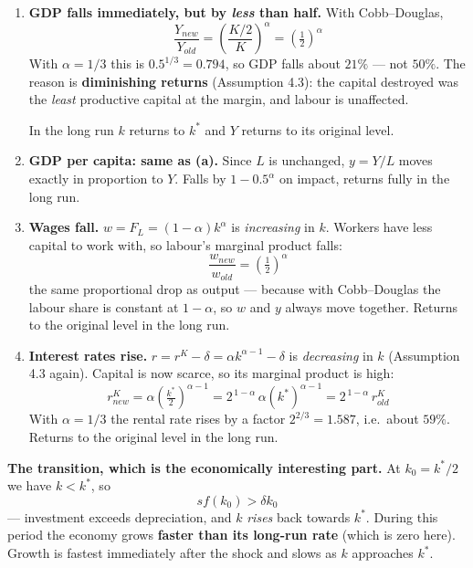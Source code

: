 \documentclass[12pt, letterpaper]{article}
\newcommand{\stst}{^{\ast}}
\begin{document}
\begin{tcolorbox}[oddbox,title={Problem 4.1 \quad An Earthquake}]
\begin{enumerate}

\item \textbf{GDP falls immediately, but by \emph{less} than half.} With Cobb--Douglas,
$$\frac{Y_{new}}{Y_{old}} = \left(\frac{K/2}{K}\right)^{\alpha} = \left(\tfrac12\right)^{\alpha}$$
With $\alpha = 1/3$ this is $0.5^{1/3} = 0.794$, so GDP falls about $21\%$ --- not $50\%$.
The reason is \textbf{diminishing returns} (Assumption 4.3): the capital destroyed was the
\emph{least} productive capital at the margin, and labour is unaffected.

In the long run $k$ returns to $k\stst$ and $Y$ returns to its original level.

\item \textbf{GDP per capita: same as (a).} Since $L$ is unchanged, $y = Y/L$ moves exactly
in proportion to $Y$. Falls by $1 - 0.5^\alpha$ on impact, returns fully in the long run.

\item \textbf{Wages fall.} $w = F_L = (1-\alpha)k^{\alpha}$ is \emph{increasing} in $k$.
Workers have less capital to work with, so labour's marginal product falls:
$$\frac{w_{new}}{w_{old}} = \left(\tfrac12\right)^{\alpha}$$
the same proportional drop as output --- because with Cobb--Douglas the labour share is
constant at $1-\alpha$, so $w$ and $y$ always move together. Returns to the original level in
the long run.

\item \textbf{Interest rates rise.} $r = r^K - \delta = \alpha k^{\alpha-1} - \delta$ is
\emph{decreasing} in $k$ (Assumption 4.3 again). Capital is now scarce, so its marginal
product is high:
$$r^K_{new} = \alpha\left(\tfrac{k\stst}{2}\right)^{\alpha-1}
= 2^{\,1-\alpha}\,\alpha (k\stst)^{\alpha-1} = 2^{\,1-\alpha}\, r^K_{old}$$
With $\alpha = 1/3$ the rental rate rises by a factor $2^{2/3} = 1.587$, i.e.\ about $59\%$.
Returns to the original level in the long run.

\end{enumerate}

\textbf{The transition, which is the economically interesting part.} At $k_0 = k\stst/2$ we
have $k < k\stst$, so
$$s f(k_0) > \delta k_0$$
--- investment exceeds depreciation, and $k$ \emph{rises} back towards $k\stst$. During this
period the economy grows \textbf{faster than its long-run rate} (which is zero here). Growth
is fastest immediately after the shock and slows as $k$ approaches $k\stst$.


\end{tcolorbox}
\end{document}
